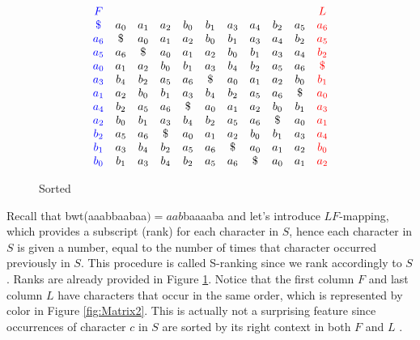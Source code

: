 \documentclass[12pt]{article} %
\begin{document}
\begin{figure}[H]
\[
\begin{array}{*{11}c}
{\color{blue} F } &  &  & & & & & & & & {\color{red} L }  \\ 
{\color{blue} \$ } & a_0 & a_1 & a_2 & b_0 & b_1 & a_3 & a_4 & b_2 & a_5 & {\color{red} a_6 } \\
{\color{blue} a_6 } & \$ & a_0 & a_1 & a_2 & b_0 & b_1 & a_3 & a_4 & b_2 & {\color{red} a_5 }  \\
{\color{blue} a_5 } & a_6 & \$ & a_0 & a_1 & a_2 & b_0 & b_1 & a_3 & a_4 & {\color{red} b_2 } \\
{\color{blue} a_0 } & a_1 & a_2 & b_0 & b_1 & a_3 & b_4 & b_2 & a_5 & a_6 & {\color{red} \$ } \\
{\color{blue} a_3 }  & b_4 & b_2 & a_5 & a_6 & \$ & a_0 & a_1 & a_2 & b_0 & {\color{red} b_1 } \\
{\color{blue} a_1 } & a_2 & b_0 & b_1 & a_3 & b_4 & b_2 & a_5 & a_6 & \$ & {\color{red} a_0 }  \\
{\color{blue} a_4 }  & b_2 & a_5 & a_6 & \$ & a_0 & a_1 & a_2 & b_0 & b_1 & {\color{red} a_3 } \\
{\color{blue} a_2 } & b_0 & b_1 & a_3 & b_4 & b_2 & a_5 & a_6 & \$ & a_0 & {\color{red} a_1 } \\
{\color{blue} b_2  } & a_5 & a_6 & \$ & a_0 & a_1 & a_2 & b_0 & b_1 & a_3 & {\color{red} a_4 } \\
{\color{blue} b_1 }  & a_3 & b_4 & b_2 & a_5 & a_6 & \$ & a_0 & a_1 & a_2 & {\color{red} b_0 }  \\ 
{\color{blue} b_0 }  & b_1 & a_3 & b_4 & b_2 & a_5 & a_6 & \$ & a_0 & a_1 & {\color{red} a_2 } \\
\end{array}
\]
\captionsetup{width=0.8\textwidth}
\caption{Sorted}
\label{fig:Matrix1}
\end{figure}

Recall that bwt(aaabbaabaa$) = aab$baaaaba and let's introduce $LF$-mapping, which provides a subscript (rank) for each character in $S$, hence each character in $S$ is given a number, equal to the number of times that character occurred previously in $S$. This procedure is called S-ranking since we rank accordingly to $S$. Ranks are already provided in Figure  \ref{fig:Matrix1}. Notice that the first column $F$ and last column $L$ have characters that occur in the same order, which is represented by color in Figure \ref{fig:Matrix2}. This is actually not a surprising feature since occurrences of character $c$ in $S$ are sorted by its right context in both $F$ and $L$ \cite{bwtfmindex}.
\end{document}
